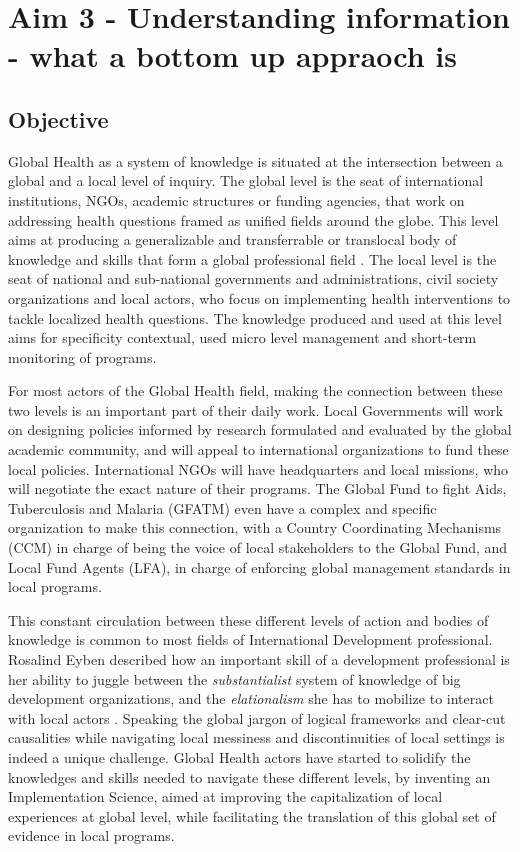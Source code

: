 \section[Understanding Information]{Aim 3 - Understanding information - what a bottom up appraoch is}

\subsection{Objective}
Global Health as a system of knowledge is situated at the intersection between a global and a local level of inquiry. The global level is the seat of international institutions, NGOs, academic structures or funding agencies, that work on addressing health questions framed as unified fields around the globe. This level aims at producing a generalizable and transferrable or translocal  body of knowledge and skills that form a global professional field \citep{merry_measuring_2011}. The local level is the seat of national and sub-national governments and administrations, civil society organizations and local actors, who focus on implementing health interventions to tackle localized health questions. The knowledge produced and used at this level aims for specificity contextual, used micro level management and short-term monitoring of programs.

For most actors of the Global Health field, making the connection between these two levels is an important part of their daily work. Local Governments will work on designing policies informed by research formulated and evaluated by the global academic community, and will appeal to international organizations to fund these local policies. International NGOs will have headquarters and local missions, who will negotiate the exact nature of their programs. The Global Fund to fight Aids, Tuberculosis and Malaria (GFATM) even have a complex and specific organization to make this connection, with a Country Coordinating Mechanisms (CCM) in charge of being the voice of local stakeholders to the Global Fund, and Local Fund Agents (LFA), in charge of enforcing global management standards in local programs.

This constant circulation between these different levels of action and bodies of knowledge is common to most fields of International Development professional. Rosalind Eyben described how an important skill of a development professional is her ability to juggle between the \textit{substantialist} system of knowledge of big development organizations, and the \textit{elationalism} she has to mobilize to interact with local actors \citep{eyben_hiding_2010}. Speaking the global jargon of logical frameworks and clear-cut causalities while navigating local messiness and discontinuities of local settings is indeed a unique challenge. Global Health actors have started to solidify the knowledges and skills needed to navigate these different levels, by inventing an Implementation Science, aimed at improving the capitalization of local experiences at global level, while facilitating the translation of this global set of evidence in local programs.

